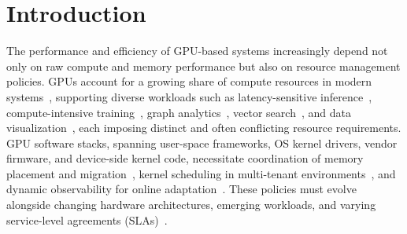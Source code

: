 \section{Introduction}



The performance and efficiency of GPU-based systems increasingly depend not only on raw compute and memory performance but also on resource management policies. GPUs account for a growing share of compute resources in modern systems~\cite{jeon2019analysis}, supporting diverse workloads such as latency-sensitive inference~\cite{kwon2023efficient,agrawal2024taming,yu2024orca}, compute-intensive training~\cite{shoeybi2019megatron,rasley2020deepspeed}, graph analytics~\cite{lin2024towards,chen2020pangolin,wang2016gunrock}, vector search~\cite{pan2024survey,cao2023gpu}, and data visualization~\cite{moreland2016vtk}, each imposing distinct and often conflicting resource requirements. GPU software stacks, spanning user-space frameworks, OS kernel drivers, vendor firmware, and device-side kernel code, necessitate coordination of memory placement and migration~\cite{sun2024llumnix,zhong2024distserve,patel2024splitwise,strati2024orion,sheng2023flexgen}, kernel scheduling in multi-tenant environments~\cite{fu2024serverlessllm,shubha2024usher,hu2023lucid,li2022miso,jayaram2023sia,xiao2018gandiva,narayanan2020heterogeneity}, and dynamic observability for online adaptation~\cite{agrawal2024vidur}. These policies must evolve alongside changing hardware architectures, emerging workloads, and varying service-level agreements (SLAs)~\cite{kwon2023efficient,yu2020fine,delimitrou2013paragon,delimitrou2014quasar,lo2015heracles,qiao2021pollux}.

